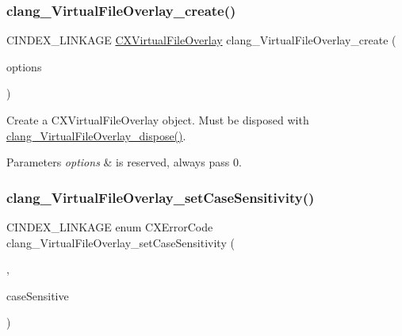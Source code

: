 \subsubsection{\texorpdfstring{clang\+\_\+\+Virtual\+File\+Overlay\+\_\+create()}{clang\_VirtualFileOverlay\_create()}}
{\footnotesize\ttfamily C\+I\+N\+D\+E\+X\+\_\+\+L\+I\+N\+K\+A\+GE \hyperlink{group__BUILD__SYSTEM_gae854e36ceb0a02071e557e19f908772d}{C\+X\+Virtual\+File\+Overlay} clang\+\_\+\+Virtual\+File\+Overlay\+\_\+create (\begin{DoxyParamCaption}\item[{unsigned}]{options }\end{DoxyParamCaption})}



Create a {\ttfamily C\+X\+Virtual\+File\+Overlay} object. Must be disposed with {\ttfamily \hyperlink{group__BUILD__SYSTEM_ga118f45b2f96f989fc1f39f3f95973deb}{clang\+\_\+\+Virtual\+File\+Overlay\+\_\+dispose()}}. 


\begin{DoxyParams}{Parameters}
{\em options} & is reserved, always pass 0. \\
\hline
\end{DoxyParams}
\mbox{\label{group__BUILD__SYSTEM_ga00ca3247ef5f5e3ac504ce13623939e3}} 
\subsubsection{\texorpdfstring{clang\+\_\+\+Virtual\+File\+Overlay\+\_\+set\+Case\+Sensitivity()}{clang\_VirtualFileOverlay\_setCaseSensitivity()}}
{\footnotesize\ttfamily C\+I\+N\+D\+E\+X\+\_\+\+L\+I\+N\+K\+A\+GE enum C\+X\+Error\+Code clang\+\_\+\+Virtual\+File\+Overlay\+\_\+set\+Case\+Sensitivity (\begin{DoxyParamCaption}\item[{\hyperlink{group__BUILD__SYSTEM_gae854e36ceb0a02071e557e19f908772d}{C\+X\+Virtual\+File\+Overlay}}]{,  }\item[{int}]{case\+Sensitive }\end{DoxyParamCaption})}



